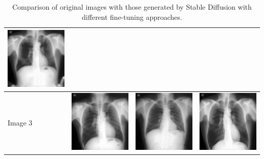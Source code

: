 \begin{table}[H]
\begin{tabularx}{\linewidth}{@{}>{\centering\arraybackslash}m{1.5cm}>{\centering\arraybackslash}X>{\centering\arraybackslash}X>{\centering\arraybackslash}X@{}}
\includegraphics[valign=M,width=\linewidth,height=3cm,keepaspectratio]{main/content/images/sd_dreambooth/dreambooth_v1_multiclass/1.png} \\
\midrule
Image 3 & 
\includegraphics[valign=M,width=\linewidth,height=3cm,keepaspectratio]{main/content/images/sd_dreambooth/original_dataset/pneumo_56.png} & 
\includegraphics[valign=M,width=\linewidth,height=3cm,keepaspectratio]{main/content/images/sd_dreambooth/dreambooth_v1/59144.jpg} & 
\includegraphics[valign=M,width=\linewidth,height=3cm,keepaspectratio]{main/content/images/sd_dreambooth/dreambooth_v1_multiclass/2.png} \\
\bottomrule
\end{tabularx}
\caption{Comparison of original images with those generated by Stable Diffusion with different fine-tuning approaches.}
\label{tab:image_comparison_dreambooth_combined}
\end{table}

